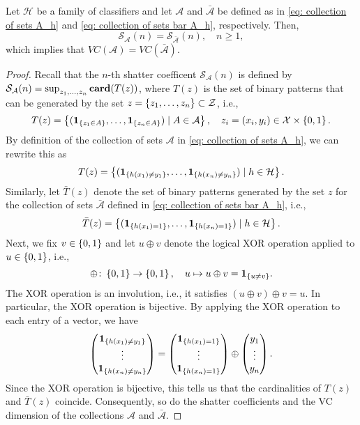 \begin{theorem}
Let $\mathcal{H}$ be a family of classifiers and let $\mathcal{A}$ and $\bar{\mathcal{A}}$ be defined as in \eqref{eq: collection of sets A_h} and \eqref{eq: collection of sets bar A_h}, respectively. Then,
\[
    \mathcal{S}_{\mathcal{A}}(n) = \mathcal{S}_{\bar{\mathcal{A}}}(n), \quad n \geq 1,
\]
which implies that $VC(\mathcal{A}) = VC(\bar{\mathcal{A}})$.
\end{theorem}

\begin{proof}
Recall that the $n$-th shatter coefficent $\mathcal{S}_{\mathcal{A}}(n)$ is defined by $\mathcal{S}_{\mathcal{A}}(n) = \sup_{z_1, \dots, z_n} \mathrm{\mathbf{card}}(T(z))$, where $T(z)$ is the set of binary patterns that can be generated by the set $z = \left\{z_1, \dots, z_n\right\} \subset \mathcal{Z}$, i.e.,
\[
    T(z) = \left\{(\mathbf{1}_{\left\{z_1 \in A\right\}}, \dots, \mathbf{1}_{\left\{z_n \in A\right\}}) \mathrel{|} A \in \mathcal{A}\right\}, \quad z_i = (x_i, y_i) \in \mathcal{X} \times \left\{0, 1\right\}.
\]
By definition of the collection of sets $\mathcal{A}$ in \eqref{eq: collection of sets A_h}, we can rewrite this as
\[
    T(z) = \left\{(\mathbf{1}_{\left\{h(x_1) \neq y_1\right\}}, \dots, \mathbf{1}_{\left\{h(x_n) \neq y_n\right\}}) \mathrel{|} h \in \mathcal{H}\right\}.
\]
Similarly, let $\bar T(z)$ denote the set of binary patterns generated by the set $z$ for the collection of sets $\bar{\mathcal{A}}$ defined in \eqref{eq: collection of sets bar A_h}, i.e.,
\[
    \bar T(z) = \left\{(\mathbf{1}_{\left\{h(x_1) = 1\right\}}, \dots, \mathbf{1}_{\left\{h(x_n) = 1\right\}}) \mathrel{|} h \in \mathcal{H}\right\}.
\]
Next, we fix $v \in \left\{0, 1\right\}$ and let $u \oplus v$ denote the logical XOR operation applied to $u \in \left\{0, 1\right\}$, i.e.,
\[
    \oplus \colon \left\{0, 1\right\} \to \left\{0, 1\right\}, \quad u \mapsto u \oplus v = \mathbf{1}_{\left\{u \neq v\right\}}.
\]
The XOR operation is an involution, i.e., it satisfies $(u \oplus v) \oplus v = u$. In particular, the XOR operation is bijective. By applying the XOR operation to each entry of a vector, we have
\[
    \begin{pmatrix}
        \mathbf{1}_{\left\{h(x_1) \neq y_1\right\}} \\
        \vdots \\
        \mathbf{1}_{\left\{h(x_n) \neq y_n\right\}}
    \end{pmatrix} =
    \begin{pmatrix}
        \mathbf{1}_{\left\{h(x_1) = 1\right\}} \\
        \vdots \\
        \mathbf{1}_{\left\{h(x_n) = 1\right\}}
    \end{pmatrix} \oplus
    \begin{pmatrix}
        y_1 \\
        \vdots \\
        y_n
    \end{pmatrix}.
\]
Since the XOR operation is bijective, this tells us that the cardinalities of $T(z)$ and $\bar T(z)$ coincide. Consequently, so do the shatter coefficients and the VC dimension of the collections $\mathcal{A}$ and $\bar{\mathcal{A}}$.
\end{proof}

